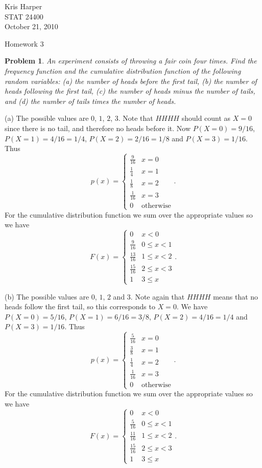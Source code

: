 \documentclass{article}
\newtheorem{problem}{Problem}
\begin{document}
\begin{flushright}
Kris Harper\\

STAT 24400\\

October 21, 2010
\end{flushright}

\begin{center}
Homework 3
\end{center}

\begin{problem}
An experiment consists of throwing a fair coin four times. Find the frequency function and the cumulative distribution function of the following random variables: (a) the number of heads before the first tail, (b) the number of heads following the first tail, (c) the number of heads minus the number of tails, and (d) the number of tails times the number of heads.
\end{problem}

(a) The possible values are $0$, $1$, $2$, $3$. Note that $HHHH$ should count as $X = 0$ since there is no tail, and therefore no heads before it. Now $P(X = 0) = 9/16$, $P(X = 1) = 4/16 = 1/4$, $P(X = 2) = 2/16 = 1/8$ and $P(X = 3) = 1/16$. Thus
\[
p(x) =
\begin{cases}
\frac{9}{16} & x = 0\\
\frac{1}{4} & x = 1\\
\frac{1}{8} & x = 2\\
\frac{1}{16} & x = 3\\
0 & \text{otherwise}
\end{cases}.
\]
For the cumulative distribution function we sum over the appropriate values so we have
\[
F(x) =
\begin{cases}
0 & x < 0\\
\frac{9}{16} & 0 \leq x < 1\\
\frac{13}{16} & 1 \leq x < 2\\
\frac{15}{16} & 2 \leq x < 3\\
1 & 3 \leq x
\end{cases}.
\]

(b) The possible values are $0$, $1$, $2$ and $3$. Note again that $HHHH$ means that no heads follow the first tail, so this corresponds to $X = 0$. We have $P(X = 0) = 5/16$, $P(X = 1) = 6/16 = 3/8$, $P(X = 2) = 4/16 = 1/4$ and $P(X = 3) = 1/16$. Thus
\[
p(x) =
\begin{cases}
\frac{5}{16} & x = 0\\
\frac{3}{8} & x = 1\\
\frac{1}{4} & x = 2\\
\frac{1}{16} & x = 3\\
0 & \text{otherwise}
\end{cases}.
\]
For the cumulative distribution function we sum over the appropriate values so we have
\[
F(x) =
\begin{cases}
0 & x < 0\\
\frac{5}{16} & 0 \leq x < 1\\
\frac{11}{16} & 1 \leq x < 2\\
\frac{15}{16} & 2 \leq x < 3\\
1 & 3 \leq x
\end{cases}.
\]
\end{document}
